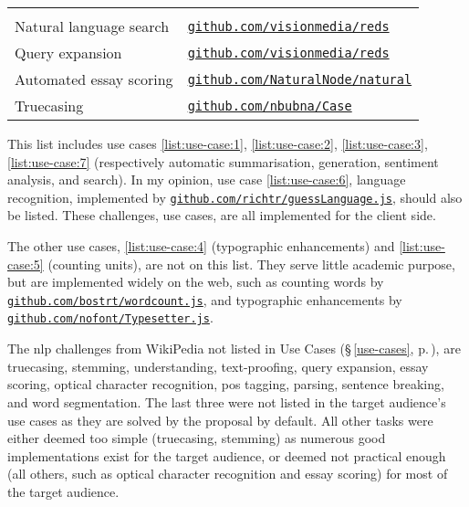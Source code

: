 {\begin{tabular}{ l p{5.25cm} }
{  }\\
  Natural language search &{\raggedright
  \href{https://github.com/visionmedia/reds}{\nolinkurl{github.com/visionmedia/reds}}
  }\\
  Query expansion &{\raggedright
  \href{https://github.com/visionmedia/reds}{\nolinkurl{github.com/visionmedia/reds}}
  }\\
  Automated essay scoring &{\raggedright
  \href{https://github.com/NaturalNode/natural}{\nolinkurl{github.com/NaturalNode/natural}}
  }\\
  Truecasing &{\raggedright
  \href{https://github.com/nbubna/Case}{\nolinkurl{github.com/nbubna/Case}}
  }\\
\end{tabular}
}

\medskip\noindent This list includes use cases \ref{list:use-case:1},
  \ref{list:use-case:2}, \ref{list:use-case:3}, \ref{list:use-case:7}
  (respectively automatic summarisation, generation, sentiment analysis, and
  search).
In my opinion, use case \ref{list:use-case:6}, language recognition,
  implemented by
  \href{https://github.com/richtr/guessLanguage.js}{\nolinkurl{github.com/richtr/guessLanguage.js}},
  should also be listed.
These challenges, use cases, are all implemented for the client side.

The other use cases, \ref{list:use-case:4} (typographic enhancements) and
  \ref{list:use-case:5} (counting units), are not on this list.
They serve little academic purpose, but are implemented widely on the
  web, such as counting words by
  \href{https://github.com/bostrt/wordcount.js}{\nolinkurl{github.com/bostrt/wordcount.js}},
  and typographic enhancements by
  \href{https://github.com/nofont/Typesetter.js}{\nolinkurl{github.com/nofont/Typesetter.js}}.

The \gls{nlp} challenges from WikiPedia not listed in Use Cases
  (§\,\ref{use-cases}, p.\,\pageref{use-cases}), are truecasing,
  stemming, understanding, text-proofing, query expansion, essay scoring,
  optical character recognition, \gls{pos} tagging, parsing,
  sentence breaking, and word segmentation.
The last three were not listed in the target audience's use cases as they
  are solved by the proposal by default.
All other tasks were either deemed too simple (truecasing, stemming) as
  numerous good implementations exist for the target audience, or deemed not
  practical enough (all others, such as optical character recognition and
  essay scoring) for most of the target audience.

